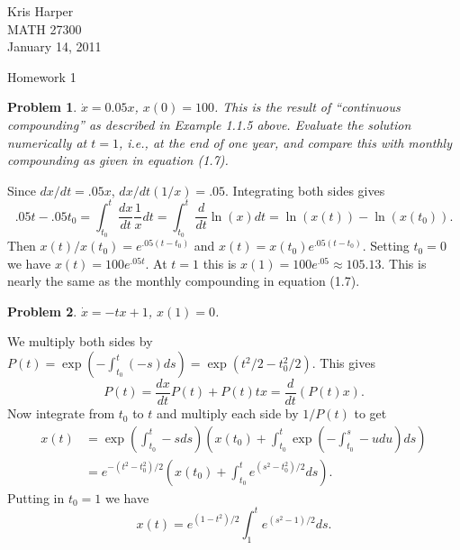 \documentclass{article}
\newtheorem{problem}{Problem}
\begin{document}
\begin{flushright}
Kris Harper\\

MATH 27300\\

January 14, 2011
\end{flushright}

\begin{center}
Homework 1
\end{center}

\begin{problem}
$\dot{x} = 0.05x$, $x(0) = 100$. This is the result of ``continuous compounding'' as described in Example 1.1.5 above. Evaluate the solution numerically at $t = 1$, i.e., at the end of one year, and compare this with monthly compounding as given in equation (1.7).
\end{problem}

Since $dx/dt = .05x$, $dx/dt (1/x) = .05$. Integrating both sides gives
\[
.05t - .05t_0 = \int_{t_0}^t \frac{dx}{dt} \frac{1}{x} dt = \int_{t_0}^t \frac{d}{dt} \ln(x) dt = \ln(x(t)) - \ln(x(t_0)).
\]
Then $x(t)/x(t_0) = e^{.05(t-t_0)}$ and $x(t) = x(t_0) e^{.05(t-t_0)}$. Setting $t_0 = 0$ we have $x(t) = 100e^{.05t}$. At $t = 1$ this is $x(1) = 100e^{.05} \approx 105.13$. This is nearly the same as the monthly compounding in equation (1.7).

\begin{problem}
\label{specific}
$\dot{x} = -tx +1$, $x(1) = 0$.
\end{problem}

We multiply both sides by $P(t) = \exp \left ( - \int_{t_0}^t (-s) ds \right ) = \exp \left (t^2/2 - t_0^2/2 \right )$. This gives
\[
P(t) = \frac{dx}{dt} P(t) + P(t) tx = \frac{d}{dt} (P(t) x).
\]
Now integrate from $t_0$ to $t$ and multiply each side by $1/P(t)$ to get
\begin{align*}
x(t)
&= \exp \left ( \int_{t_0}^t -s ds \right ) \left ( x(t_0) + \int_{t_0}^t \exp \left ( - \int_{t_0}^s -u du \right ) ds \right )\\
&= e^{-(t^2-t_0^2)/2} \left (x(t_0) + \int_{t_0}^t e^{(s^2-t_0^2)/2} ds \right ).
\end{align*}
Putting in $t_0 = 1$ we have
\[
x(t) = e^{(1-t^2)/2} \int_1^t e^{(s^2-1)/2} ds.
\]
\end{document}
